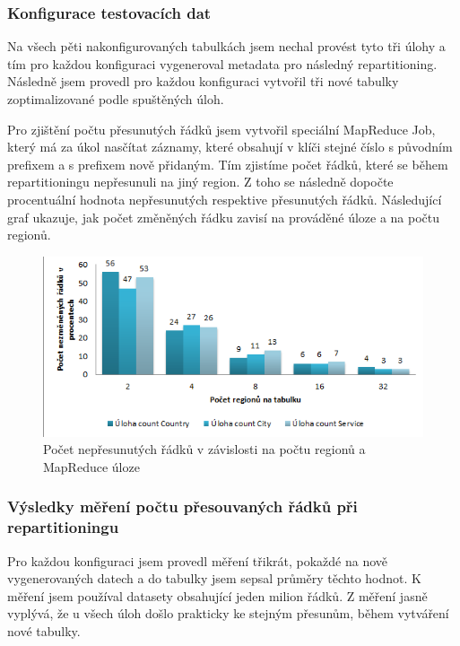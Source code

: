 \documentclass[thesis=M,czech]{FITthesis}[2012/06/26]
\begin{document}
\subsubsection{Konfigurace testovacích dat}
Na všech pěti nakonfigurovaných tabulkách jsem nechal provést tyto tři úlohy a tím pro každou konfiguraci vygeneroval metadata pro následný repartitioning.  Následně jsem provedl pro každou konfiguraci vytvořil tři nové tabulky zoptimalizované podle spuštěných úloh. 


Pro zjištění počtu přesunutých řádků jsem vytvořil speciální MapReduce Job, který má za úkol nasčítat záznamy, které obsahují v klíči stejné číslo s původním prefixem a s prefixem nově přidaným. Tím zjistíme počet řádků, které se během repartitioningu nepřesunuli na jiný region. Z toho se následně dopočte procentuální hodnota nepřesunutých respektive přesunutých řádků. Následující graf ukazuje, jak počet změněných řádku zavisí na prováděné úloze a na počtu regionů.

\begin{figure}[h]\centering
	\includegraphics[width=1\textwidth, angle=0]{files/graf-presuny}
	\caption[Počet nepřesunutých řádků v závislosti na počtu regionů a MapReduce úloze]
	{Počet nepřesunutých řádků v závislosti na počtu regionů a MapReduce úloze}\label{fig:eko}
\end{figure}

\subsubsection{Výsledky měření počtu přesouvaných řádků při repartitioningu}
Pro každou konfiguraci jsem provedl měření třikrát, pokaždé na nově vygenerovaných datech a do tabulky jsem sepsal průměry těchto hodnot. K měření jsem používal datasety obsahující jeden milion řádků. Z měření jasně vyplývá, že u všech úloh došlo prakticky ke stejným přesunům, během vytváření nové tabulky. 
\end{document}

